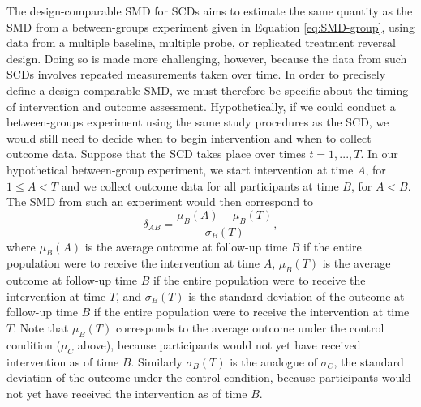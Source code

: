 \documentclass[
]{book}
\begin{document}
The design-comparable SMD for SCDs aims to estimate the same quantity as the SMD from a between-groups experiment given in Equation \eqref{eq:SMD-group}, using data from a multiple baseline, multiple probe, or replicated treatment reversal design. Doing so is made more challenging, however, because the data from such SCDs involves repeated measurements taken over time. In order to precisely define a design-comparable SMD, we must therefore be specific about the timing of intervention and outcome assessment. Hypothetically, if we could conduct a between-groups experiment using the same study procedures as the SCD, we would still need to decide when to begin intervention and when to collect outcome data. Suppose that the SCD takes place over times \(t=1,...,T\). In our hypothetical between-group experiment, we start intervention at time \(A\), for \(1 \leq A < T\) and we collect outcome data for all participants at time \(B\), for \(A < B\). The SMD from such an experiment would then correspond to
\begin{equation}
\label{eq:SMD-SCD}
\delta_{AB} = \frac{\mu_B(A) - \mu_B(T)}{\sigma_B(T)},
\end{equation}
where \(\mu_B(A)\) is the average outcome at follow-up time \(B\) if the entire population were to receive the intervention at time \(A\), \(\mu_B(T)\) is the average outcome at follow-up time \(B\) if the entire population were to receive the intervention at time \(T\), and \(\sigma_B(T)\) is the standard deviation of the outcome at follow-up time \(B\) if the entire population were to receive the intervention at time \(T\). Note that \(\mu_B(T)\) corresponds to the average outcome under the control condition (\(\mu_C\) above), because participants would not yet have received intervention as of time \(B\). Similarly \(\sigma_B(T)\) is the analogue of \(\sigma_C\), the standard deviation of the outcome under the control condition, because participants would not yet have received the intervention as of time \(B\).
\end{document}
